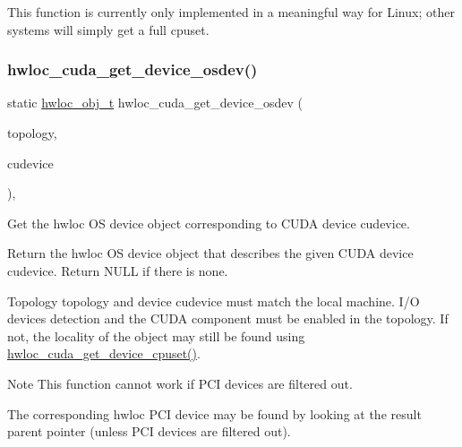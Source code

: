 This function is currently only implemented in a meaningful way for Linux; other systems will simply get a full cpuset. \mbox{\label{a00219_ga252cb72175f1a2d682f883a0add80a66}} 
\subsubsection{\texorpdfstring{hwloc\+\_\+cuda\+\_\+get\+\_\+device\+\_\+osdev()}{hwloc\_cuda\_get\_device\_osdev()}}
{\footnotesize\ttfamily static \hyperlink{a00185_ga79b8ab56877ef99ac59b833203391c7d}{hwloc\+\_\+obj\+\_\+t} hwloc\+\_\+cuda\+\_\+get\+\_\+device\+\_\+osdev (\begin{DoxyParamCaption}\item[{\hyperlink{a00186_ga9d1e76ee15a7dee158b786c30b6a6e38}{hwloc\+\_\+topology\+\_\+t}}]{topology,  }\item[{C\+Udevice}]{cudevice }\end{DoxyParamCaption})\hspace{0.3cm}{\ttfamily [inline]}, {\ttfamily [static]}}



Get the hwloc OS device object corresponding to C\+U\+DA device {\ttfamily cudevice}. 

Return the hwloc OS device object that describes the given C\+U\+DA device {\ttfamily cudevice}. Return N\+U\+LL if there is none.

Topology {\ttfamily topology} and device {\ttfamily cudevice} must match the local machine. I/O devices detection and the C\+U\+DA component must be enabled in the topology. If not, the locality of the object may still be found using \hyperlink{a00219_gaec41c6b4dc3361156beb7dea2a74f5a3}{hwloc\+\_\+cuda\+\_\+get\+\_\+device\+\_\+cpuset()}.

\begin{DoxyNote}{Note}
This function cannot work if P\+CI devices are filtered out.

The corresponding hwloc P\+CI device may be found by looking at the result parent pointer (unless P\+CI devices are filtered out). 
\end{DoxyNote}
\mbox{\label{a00219_ga12ee892994ed037e8f64bbffda02cf2e}} 

